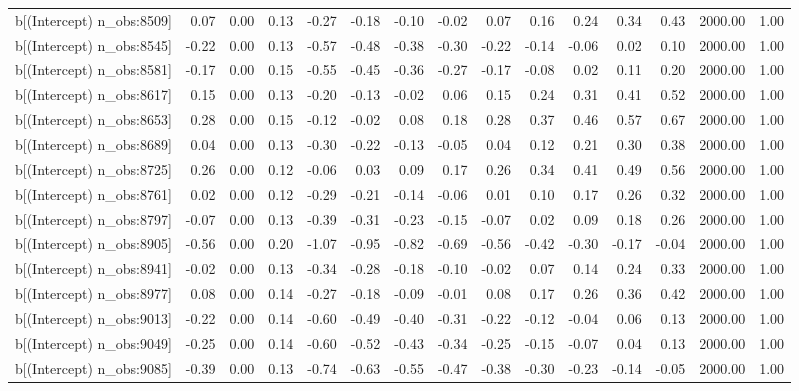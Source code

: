 \begin{table}[ht]
\begin{tabular}{rrrrrrrrrrrrrrr}
  b[(Intercept) n\_obs:8509] & 0.07 & 0.00 & 0.13 & -0.27 & -0.18 & -0.10 & -0.02 & 0.07 & 0.16 & 0.24 & 0.34 & 0.43 & 2000.00 & 1.00 \\ 
  b[(Intercept) n\_obs:8545] & -0.22 & 0.00 & 0.13 & -0.57 & -0.48 & -0.38 & -0.30 & -0.22 & -0.14 & -0.06 & 0.02 & 0.10 & 2000.00 & 1.00 \\ 
  b[(Intercept) n\_obs:8581] & -0.17 & 0.00 & 0.15 & -0.55 & -0.45 & -0.36 & -0.27 & -0.17 & -0.08 & 0.02 & 0.11 & 0.20 & 2000.00 & 1.00 \\ 
  b[(Intercept) n\_obs:8617] & 0.15 & 0.00 & 0.13 & -0.20 & -0.13 & -0.02 & 0.06 & 0.15 & 0.24 & 0.31 & 0.41 & 0.52 & 2000.00 & 1.00 \\ 
  b[(Intercept) n\_obs:8653] & 0.28 & 0.00 & 0.15 & -0.12 & -0.02 & 0.08 & 0.18 & 0.28 & 0.37 & 0.46 & 0.57 & 0.67 & 2000.00 & 1.00 \\ 
  b[(Intercept) n\_obs:8689] & 0.04 & 0.00 & 0.13 & -0.30 & -0.22 & -0.13 & -0.05 & 0.04 & 0.12 & 0.21 & 0.30 & 0.38 & 2000.00 & 1.00 \\ 
  b[(Intercept) n\_obs:8725] & 0.26 & 0.00 & 0.12 & -0.06 & 0.03 & 0.09 & 0.17 & 0.26 & 0.34 & 0.41 & 0.49 & 0.56 & 2000.00 & 1.00 \\ 
  b[(Intercept) n\_obs:8761] & 0.02 & 0.00 & 0.12 & -0.29 & -0.21 & -0.14 & -0.06 & 0.01 & 0.10 & 0.17 & 0.26 & 0.32 & 2000.00 & 1.00 \\ 
  b[(Intercept) n\_obs:8797] & -0.07 & 0.00 & 0.13 & -0.39 & -0.31 & -0.23 & -0.15 & -0.07 & 0.02 & 0.09 & 0.18 & 0.26 & 2000.00 & 1.00 \\ 
  b[(Intercept) n\_obs:8905] & -0.56 & 0.00 & 0.20 & -1.07 & -0.95 & -0.82 & -0.69 & -0.56 & -0.42 & -0.30 & -0.17 & -0.04 & 2000.00 & 1.00 \\ 
  b[(Intercept) n\_obs:8941] & -0.02 & 0.00 & 0.13 & -0.34 & -0.28 & -0.18 & -0.10 & -0.02 & 0.07 & 0.14 & 0.24 & 0.33 & 2000.00 & 1.00 \\ 
  b[(Intercept) n\_obs:8977] & 0.08 & 0.00 & 0.14 & -0.27 & -0.18 & -0.09 & -0.01 & 0.08 & 0.17 & 0.26 & 0.36 & 0.42 & 2000.00 & 1.00 \\ 
  b[(Intercept) n\_obs:9013] & -0.22 & 0.00 & 0.14 & -0.60 & -0.49 & -0.40 & -0.31 & -0.22 & -0.12 & -0.04 & 0.06 & 0.13 & 2000.00 & 1.00 \\ 
  b[(Intercept) n\_obs:9049] & -0.25 & 0.00 & 0.14 & -0.60 & -0.52 & -0.43 & -0.34 & -0.25 & -0.15 & -0.07 & 0.04 & 0.13 & 2000.00 & 1.00 \\ 
  b[(Intercept) n\_obs:9085] & -0.39 & 0.00 & 0.13 & -0.74 & -0.63 & -0.55 & -0.47 & -0.38 & -0.30 & -0.23 & -0.14 & -0.05 & 2000.00 & 1.00 \\ 

\end{tabular}
\end{table}
